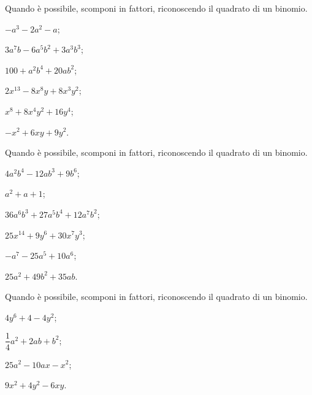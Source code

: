 \begin{esercizio}
\label{ese:13.27}
Quando è possibile, scomponi in fattori, riconoscendo il quadrato di un binomio.
\begin{multicols}{3}
\begin{enumeratea}
 \item $-a^{3}-2a^{2}-a$;
 \item $3a^{7}b-6a^{5}b^{2}+3a^{3}b^{3}$;
 \item $100+a^{2}b^{4}+20ab^{2}$;
 \item $2x^{13}-8x^{8}y+8x^{3}y^{2}$;
 \item $x^{8}+8x^{4}y^{2}+16y^{4}$;
 \item $-x^{2}+6{xy}+9y^{2}$.
\end{enumeratea}
\end{multicols}
\end{esercizio}

\begin{esercizio}
\label{ese:13.28}
Quando è possibile, scomponi in fattori, riconoscendo il quadrato di un binomio.
\begin{multicols}{2}
\begin{enumeratea}
 \item $4a^{2}b^{4}-12ab^{3}+9b^{6}$;
 \item $a^{2}+a+1$;
 \item $36a^{6}b^{3}+27a^{5}b^{4}+12a^{7}b^{2}$;
 \item $25x^{14}+9y^{6}+30x^{7}y^{3}$;
 \item $-a^{7}-25a^{5}+10a^{6}$;
 \item $25a^{2}+49b^{2}+35ab$.
\end{enumeratea}
\end{multicols}
\end{esercizio}

\begin{esercizio}
\label{ese:13.29}
Quando è possibile, scomponi in fattori, riconoscendo il quadrato di un binomio.
\begin{multicols}{2}
\begin{enumeratea}
 \item $4y^{6}+4-4y^{2}$;
 \item $\dfrac{1}{4}a^{2}+2ab+b^{2}$;
 \item $25a^{2}-10{ax}-x^{2}$;
 \item $9x^{2}+4y^{2}-6{xy}$.
\end{enumeratea}
\end{multicols}
\end{esercizio}

